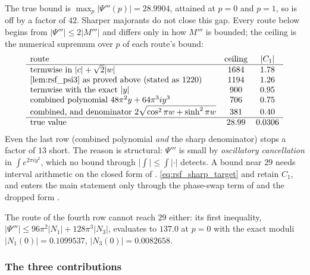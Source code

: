 \begin{remark}
\label{rem:rsf_psi3_refuted}
The true bound is $\max_{p}\lvert\Psi'''(p)\rvert=28.9904$, attained at $p=0$ and $p=1$, so
 is off by a factor of $42$.  Sharper majorants do not close this gap.
Every route below begins from $\lvert\Psi'''\rvert\le2\lvert M'''\rvert$ and differs only in
how $M'''$ is bounded; the ceiling is the numerical supremum over $p$ of each route's bound:
\[
  \begin{array}{lcc}
    \text{route} & \text{ceiling} & \lvert C_{1}\rvert\\\hline
    \text{termwise in }\lvert c\rvert+\sqrt2\lvert w\rvert & 1684 & 1.78\\
    \text{\Cref{lem:rsf_psi3} as proved above (stated as $1220$)} & 1194 & 1.26\\
    \text{termwise with the exact }\lvert y\rvert & 900 & 0.95\\
    \text{combined polynomial }48\pi^{2}y+64\pi^{3}iy^{3} & 706 & 0.75\\
    \text{combined, and denominator }2\sqrt{\cos^{2}\pi w+\sinh^{2}\pi w} & 381 & 0.40\\\hline
    \text{true value} & 28.99 & 0.0306
  \end{array}
\]
Even the last row (combined polynomial \emph{and} the sharp denominator) stops a factor of
$13$ short.  The reason is structural: $\Psi'''$ is small by \emph{oscillatory cancellation} in
$\int e^{2\pi iy^{2}}$, which no bound through $\lvert\int\rvert\le\int\lvert\cdot\rvert$
detects.  A bound near $29$ needs interval arithmetic on the closed form of
.  \eqref{eq:rsf_sharp_target} and 
retain $C_{1}$, and  enters the main statement only through the phase-swap
term of  and the dropped form .

The route of the fourth row cannot reach $29$ either: its first inequality,
$\lvert\Psi'''\rvert\le96\pi^{2}\lvert N_{1}\rvert+128\pi^{3}\lvert N_{3}\rvert$, evaluates to
$137.0$ at $p=0$ with the exact moduli $\lvert N_{1}(0)\rvert=0.1099537$,
$\lvert N_{3}(0)\rvert=0.0082658$.
\end{remark}

\subsubsection*{The three contributions}

